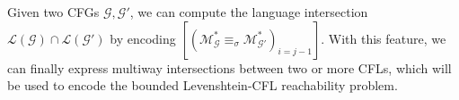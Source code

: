 \documentclass[sigplan,review,anonymous,acmsmall]{acmart}\settopmatter{printfolios=false,printccs=false,printacmref=false}
\begin{document}

Given two CFGs $\mathcal{G}, \mathcal{G}'$, we can compute the language intersection $\mathcal{L}(\mathcal{G})\cap\mathcal{L}(\mathcal{G}')$ by encoding $\left[(\mathcal{M}_{\mathcal{G}}^* \equiv_\sigma \mathcal{M}_{\mathcal{G}'}^*)_{i=j-1}\right]$. With this feature, we can finally express multiway intersections between two or more CFLs, which will be used to encode the bounded Levenshtein-CFL reachability problem.



\end{document}
